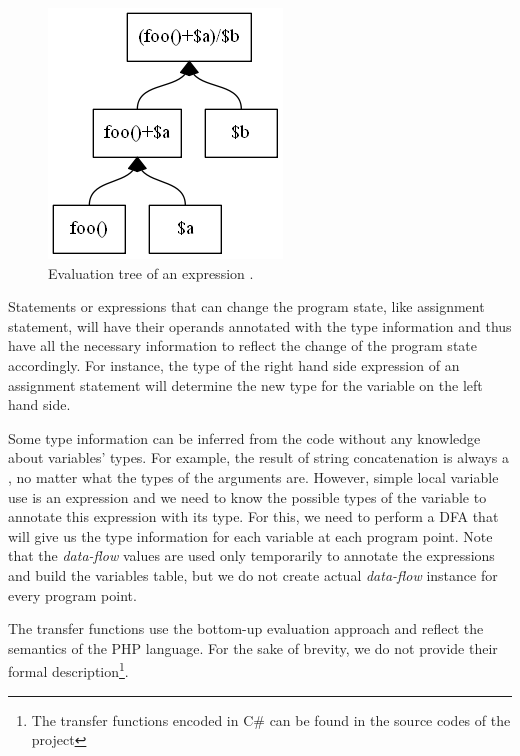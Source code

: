         \begin{figure}[h]  
          \centering        
          \includegraphics[scale=0.5]{graphs/evaltree.png}
          \caption{Evaluation tree of an expression .\label{evaltree}}    
        \end{figure}        
        
        Statements or expressions that can change the program state, 
        like assignment statement, will have their operands 
        annotated with the type information and thus have all 
        the necessary information to reflect the change of 
        the program state accordingly. For instance, 
        the type of the right hand side expression of an assignment 
        statement will determine the new type for the variable 
        on the left hand side.
        
        Some type information can be inferred from the code without 
        any knowledge about variables' types. For example, the result 
        of string concatenation is always a , no matter 
        what the types of the arguments are. However, simple local 
        variable use is an expression and we need to know the possible 
        types of the variable to annotate this expression 
        with its type. For this, we need to perform a DFA that will 
        give us the type information for each variable at each program 
        point. Note that the \emph{data-flow} values are used only 
        temporarily to annotate the expressions and build the variables 
        table, but we do not create actual \emph{data-flow} instance 
        for every program point.
        
        The transfer functions use the bottom-up evaluation approach 
        and reflect the semantics of the PHP language. For the sake of 
        brevity, we do not provide their formal description\footnote{
        The transfer functions encoded in C\# can be found in the 
        source codes of the project}.
        
